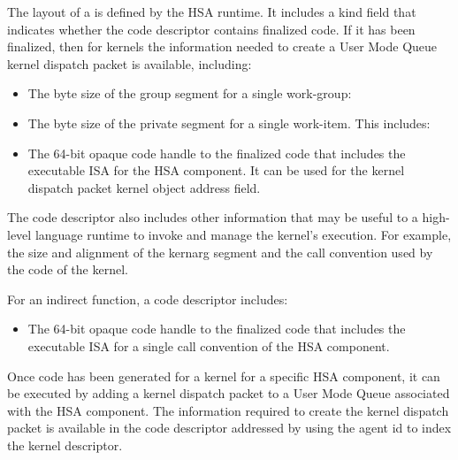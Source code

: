\documentclass[final]{book}
\begin{document}
The layout of a  is defined by the HSA runtime.
It includes a kind field  that indicates whether
the code descriptor contains finalized code. If it has been finalized, then for
kernels the information needed to create a User Mode Queue kernel dispatch
packet is available, including:
\begin{itemize}
\item{The byte size of the group segment for a single work-group:}
    
\item{The byte size of the private segment for a single work-item. This
    includes:}        
\item{The 64-bit opaque code handle to the finalized code that includes the
    executable ISA for the HSA component. It can be used for the kernel dispatch
    packet kernel object address field.}
\end{itemize}

The code descriptor also includes other information that may be useful to a
high-level language runtime to invoke and manage the kernel's execution. For
example, the size and alignment of the kernarg segment and the call convention
used by the code of the kernel.

For an indirect function, a code descriptor includes:
\begin{itemize}
\item{The 64-bit opaque code handle to the finalized code that includes the
    executable ISA for a single call convention of the HSA component.}
\end{itemize}

Once code has been generated for a kernel for a specific HSA component, it can
be executed by adding a kernel dispatch packet to a User Mode Queue associated
with the HSA component. The information required to create the kernel dispatch
packet is available in the code descriptor addressed by using the agent id to
index the kernel descriptor.
\end{document}
